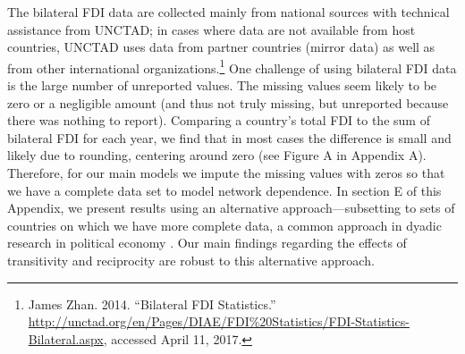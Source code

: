 \documentclass[reqno,onecolumn,letterpaper,12pt]{article}
\begin{document}
The bilateral FDI data are collected mainly from national sources with technical assistance from UNCTAD; in cases where data are not available from host countries, UNCTAD uses data from partner countries (mirror data) as well as from other international organizations.\footnote{James Zhan. 2014. ``Bilateral FDI Statistics.'' \url{http://unctad.org/en/Pages/DIAE/FDI\%20Statistics/FDI-Statistics-Bilateral.aspx}, accessed April 11, 2017.} One challenge of using bilateral FDI data is the large number of unreported values. %
The missing values seem likely to be zero or a negligible amount (and thus not truly missing, but unreported because there was nothing to report). Comparing a country's total FDI to the sum of bilateral FDI for each year, we find that in most cases the difference is small and likely due to rounding, centering around zero (see Figure A in Appendix A). Therefore, for our main models we impute the missing values with zeros so that we have a complete data set to model network dependence.  In section E of this Appendix, we present results using an alternative approach---subsetting to sets of countries on which we have more complete data, a common approach in dyadic research in political economy \citep[e.g., ][]{cao2014democracies,pettersson2013aid}. Our main findings regarding the effects of transitivity and reciprocity are robust to this alternative approach.  %
\end{document}
